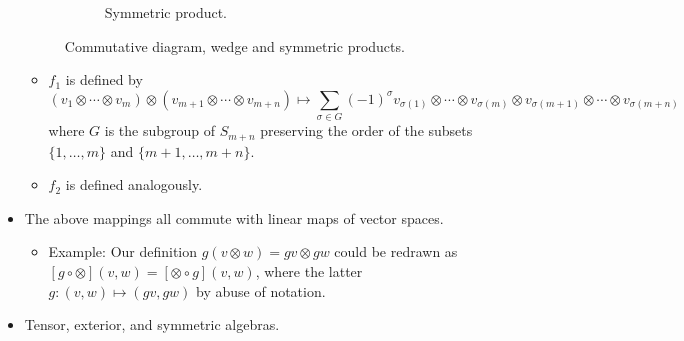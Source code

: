 \documentclass[../notes.tex]{subfiles}
\begin{document}
\begin{itemize}
\begin{figure}[h!]
\begin{subfigure}[b]{0.35\linewidth}
            \vspace{-1.5em}
            \caption{Symmetric product.}
            \label{fig:CDwedgeSymb}
        \end{subfigure}
        \EnableQuotes
        \caption{Commutative diagram, wedge and symmetric products.}
        \label{fig:CDwedgeSym}
    \end{figure}
    \begin{itemize}
        \item $f_1$ is defined by
        \begin{equation*}
            (v_1\otimes\cdots\otimes v_m)\otimes(v_{m+1}\otimes\cdots\otimes v_{m+n}) \mapsto \sum_{\sigma\in G}(-1)^\sigma v_{\sigma(1)}\otimes\cdots\otimes v_{\sigma(m)}\otimes v_{\sigma(m+1)}\otimes\cdots\otimes v_{\sigma(m+n)}
        \end{equation*}
        where $G$ is the subgroup of $S_{m+n}$ preserving the order of the subsets $\{1,\dots,m\}$ and $\{m+1,\dots,m+n\}$.
        \item $f_2$ is defined analogously.
    \end{itemize}
    \item The above mappings all commute with linear maps of vector spaces.
    \begin{itemize}
        \item Example: Our definition $g(v\otimes w)=gv\otimes gw$ could be redrawn as $[g\circ\otimes](v,w)=[\otimes\circ g](v,w)$, where the latter $g:(v,w)\mapsto(gv,gw)$ by abuse of notation.
    \end{itemize}
    \item Tensor, exterior, and symmetric algebras.
\end{itemize}
\end{document}
